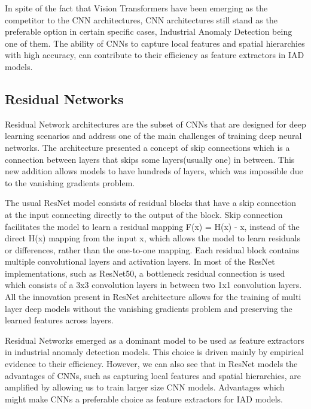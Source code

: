
In spite of the fact that Vision Transformers have been emerging as the competitor to the CNN architectures, CNN architectures still stand as the preferable option in certain specific cases, Industrial Anomaly Detection being one of them. The ability of CNNs to capture local features and spatial hierarchies with high accuracy, can contribute to their efficiency as feature extractors in IAD models.

\subsection{Residual Networks}
\label{resnet}

Residual Network architectures are the subset of CNNs that are designed for deep learning scenarios and address one of the main challenges of training deep neural networks. The architecture presented a concept of skip connections which is a connection between layers that skips some layers(usually one) in between. This new addition allows models to have hundreds of layers, which was impossible due to the vanishing gradients problem.

The usual ResNet model consists of residual blocks that have a skip connection at the input connecting directly to the output of the block. Skip connection facilitates the model to learn a residual mapping F(x) = H(x) - x, instead of the direct H(x) mapping from the input x, which allows the model to learn residuals or differences, rather than the one-to-one mapping. Each residual block contains multiple convolutional layers and activation layers. In most of the ResNet implementations, such as ResNet50, a bottleneck residual connection is used which consists of a 3x3 convolution layers in between two 1x1 convolution layers. All the innovation present in ResNet architecture allows for the training of multi layer deep models without the vanishing gradients problem and preserving the learned features across layers.


Residual Networks emerged as a dominant model to be used as feature extractors in industrial anomaly detection models. This choice is driven mainly by empirical evidence to their efficiency. However, we can also see that in ResNet models the advantages of CNNs, such as capturing local features and spatial hierarchies, are amplified by allowing us to train larger size CNN models. Advantages which might make CNNs a preferable choice as feature extractors for IAD models.

